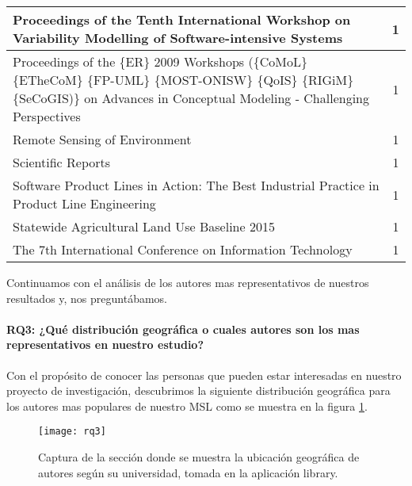 \begin{longtable}{|p{11cm}|c|}
	Proceedings of the Tenth International Workshop on Variability Modelling of Software-intensive Systems                                                                                  & 1        \\ \hline
	Proceedings of the \{ER\} 2009 Workshops (\{CoMoL\} \{ETheCoM\} \{FP-UML\} \{MOST-ONISW\} \{QoIS\} \{RIGiM\} \{SeCoGIS)\} on Advances in Conceptual Modeling - Challenging Perspectives & 1        \\ \hline
	Remote Sensing of Environment                                                                                                                                                           & 1        \\ \hline
	Scientific Reports                                                                                                                                                                      & 1        \\ \hline
	Software Product Lines in Action: The Best Industrial Practice in Product Line Engineering                                                                                              & 1        \\ \hline
	Statewide Agricultural Land Use Baseline 2015                                                                                                                                           & 1        \\ \hline
	The 7th International Conference on Information Technology                                                                                                                              & 1        \\ \hline \bottomrule
\end{longtable}


Continuamos con el análisis de los autores mas representativos de nuestros resultados y, nos preguntábamos.
\paragraph{RQ3: ¿Qué distribución geográfica o cuales autores son los mas representativos en nuestro estudio?}
Con el propósito de conocer las personas que pueden estar interesadas en nuestro proyecto de investigación, descubrimos la siguiente distribución geográfica para los autores mas populares de nuestro MSL como se muestra en la figura \ref{rq3}. 
\begin{figure}[h]
	\centering
	\texttt{[image: rq3]}
	\caption{Captura de la sección donde se muestra la  ubicación geográfica de autores según su universidad, tomada en la aplicación library.}
	\label{rq3}
\end{figure}

